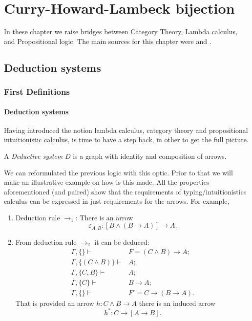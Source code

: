 
\chapter{Curry-Howard-Lambeck bijection}
In these chapter we raise bridges between Category Theory, Lambda calculus, and Propositional logic. The main sources for this chapter were  \cite{lambek1988introduction} and \cite[Chapter 6]{selinger2008lecture}.\\

\section{Deduction systems}

\subsection{First Definitions}
\subsubsection{Deduction systems}
Having introduced the notion lambda calculus, category theory and propositional intuitionistic calculus, is time to have a step back, in other to get the full picture.

\begin{definition}
  A \emph{Deductive system} $D$ is a graph  with identity and composition of arrows.
\end{definition}

We can reformulated the previous logic with this optic. Prior to that we will make an illustrative example on how is this made. All the properties aforementioned (and paired) show that the requirements of typing/intuitionistics calculus can be expressed in just requirements for the arrows. For example, 
\begin{example}
\begin{enumerate}
\item Deduction rule $\to_1$: There is an arrow $$\varepsilon_{A,B}: [B\land (B \to A)] \to A.$$
\item From deduction rule $\to_2$ it can be deduced:
  \begin{align*}
    \Gamma,\{\} \vdash & F= (C\land B)\to A;\\
    \Gamma, \{(C\land B)\} \vdash & A;\\
    \Gamma, \{C, B\} \vdash & A;\\
    \Gamma, \{C\} \vdash & B\to A;\\
    \Gamma, \{\} \vdash & F'=C \to (B \to A).
  \end{align*}
  That is provided an arrow $h: C\land B \to A$ there is an induced arrow
  $$h^*:C \to [A\to B].$$
\end{enumerate}
\end{example}


